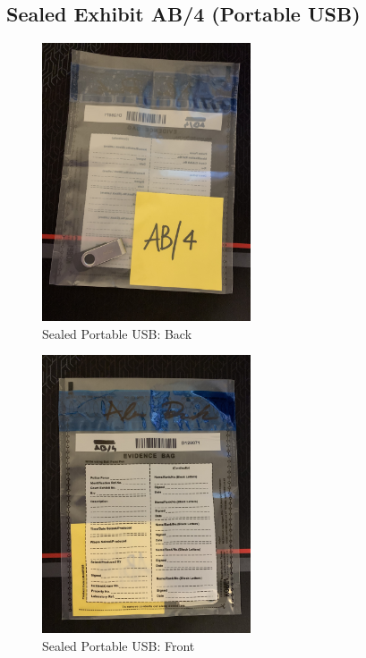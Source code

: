 \subsection{Sealed Exhibit AB/4 (Portable USB)}
\label{s:sealed-ab4}

\begin{figure}[h]
  \centering
  \includegraphics[width=0.55\textwidth, angle=-90,origin=c]{figures/pictures/IMG_5057.JPG}
  \caption{Sealed Portable USB: Back}
  \label{fig:sealed-usb-back}
\end{figure}

\begin{figure}[h]
  \centering
  \includegraphics[width=0.55\textwidth, angle=-90,origin=c]{figures/pictures/IMG_5054.JPG}
  \caption{Sealed Portable USB: Front}
  \label{fig:sealed-usb-front}
\end{figure}
\newpage

